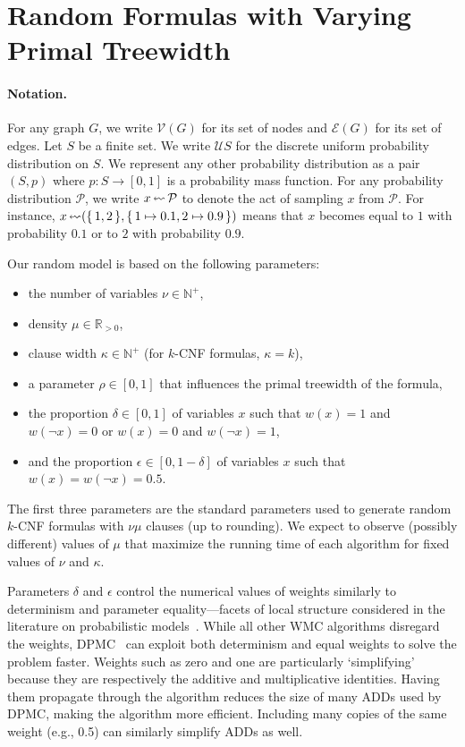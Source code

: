 \section{Random Formulas with Varying Primal Treewidth}\label{sec:model}

\paragraph*{Notation.}
For any graph $G$, we write $\mathcal{V}(G)$ for its set of nodes and
$\mathcal{E}(G)$ for its set of edges. Let $S$ be a finite set. We write
$\mathcal{U}S$ for the discrete uniform probability distribution on $S$. We
represent any other probability distribution as a pair $(S, p)$ where $p\colon S
\to [0, 1]$ is a probability mass function. For any probability distribution
$\mathcal{P}$, we write $x \leftlsquigarrow \mathcal{P}$ to denote the act of
sampling $x$ from $\mathcal{P}$. For instance, $x \leftlsquigarrow (\{\, 1, 2 \,\}, \{\, 1 \mapsto 0.1, 2 \mapsto 0.9 \,\})$ means that $x$ becomes equal to $1$ with probability $0.1$ or to $2$ with probability $0.9$.

Our random model is based on the following parameters:
\begin{itemize}
\item the number of variables $\nu \in \mathbb{N}^+$,
\item density $\mu \in \mathbb{R}_{>0}$,
\item clause width $\kappa \in \mathbb{N}^+$ (for $k$-CNF formulas, $\kappa =
  k$),
\item a parameter $\rho \in [0, 1]$ that influences the primal treewidth of
  the formula,
\item the proportion $\delta \in [0, 1]$ of variables $x$ such that $w(x) = 1$
  and $w(\neg x) = 0$ or $w(x) = 0$ and $w(\neg x) = 1$,
\item and the proportion $\epsilon \in [0, 1-\delta]$ of variables $x$ such that
  $w(x) = w(\neg x) = 0.5$.
\end{itemize}
The first three parameters are the standard parameters used to generate random
$k$-CNF formulas with $\nu\mu$ clauses (up to rounding). We expect to observe
(possibly different) values of $\mu$ that maximize the running time of each
algorithm for fixed values of $\nu$ and $\kappa$.

Parameters $\delta$ and $\epsilon$ control the numerical values of weights
similarly to determinism and parameter equality---facets of local structure
considered in the literature on probabilistic
models~\citep{DBLP:journals/ai/VlasselaerMBR16}. While all other WMC algorithms
disregard the weights, \textsc{DPMC}~\citep{DBLP:conf/cp/DudekPV20} can exploit
both determinism and equal weights to solve the problem faster. Weights such as
zero and one are particularly `simplifying' because they are respectively the
additive and multiplicative identities. Having them propagate through the
algorithm reduces the size of many ADDs used by \textsc{DPMC}, making the
algorithm more efficient. Including many copies of the same weight (e.g., 0.5)
can similarly simplify ADDs as well.

